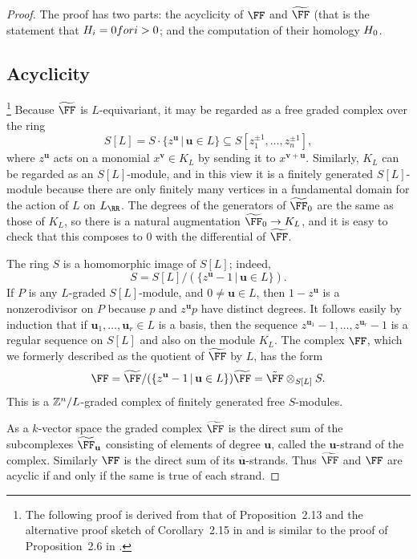 \documentclass{amsart}
\begin{document}
\begin{proof}
The proof has two parts: the acyclicity of $\FF$ and $\tF$ (that is the statement that $H_i = 0 for i>0$; and the computation of their homology $H_0$.

\subsection{Acyclicity}
\footnote{The following proof is derived from that of Proposition~2.13 and the alternative proof sketch of Corollary~2.15 in \cite{BCHS+25} and is similar to the proof of Proposition~2.6 in \cite{BH25}.}
Because $\tF$ is $L$-equivariant, it may be regarded as a free graded complex over the ring
\[
S[L]=S\cdot \{z^{\mathbf{u}} \,|\, \mathbf{u}\in L\}\subseteq S[z_1^{\pm1},\ldots,z_n^{\pm1}],
\]
where $z^{\mathbf{u}}$ acts on a monomial $x^{\mathbf{v}}\in K_L$ by sending it to $x^{\mathbf{v}+\mathbf{u}}$. Similarly, $K_L$ can be regarded as an $S[L]$-module, and in this view it is a finitely generated $S[L]$-module because there are only finitely many vertices in a
fundamental domain for the action of $L$ on $L_\RR$. The degrees of the generators of
$\tF_0$ are the same as those of $K_L$, so there is a natural augmentation $\tF_0\to K_L$, and it is easy to check that this composes to 0 with the differential of $\tF$.

The ring $S$ is a homomorphic image of $S[L]$; indeed,
$$
S = S[L]/(\{ z^{\mathbf{u}}-1 \,|\, \mathbf{u}\in L\}).
$$
If $P$ is any $L$-graded $S[L]$-module, and $0 \neq \mathbf{u}\in L$, then $1-z^{\mathbf{u}}$ is a nonzerodivisor on $P$ because $p$ and $z^{\mathbf{u}}p$ have distinct degrees. It follows easily by induction that if $\mathbf{u}_1,\ldots,\mathbf{u}_r\in L$ is a basis, then the sequence $z^{\mathbf{u}_1}-1,\ldots,z^{\mathbf{u}_r}-1$ is a regular sequence on $S[L]$ and also on the module $K_L$. The complex
 $\FF$, which we formerly described as the quotient of $\tF$ by $L$,  has the form
 $$
 \FF = \tF/(\{ z^{\mathbf{u}}-1 \,|\, \mathbf{u}\in L\})\tF =   \tilde \FF \otimes_{S[L]} S.
$$
This is a $\mathbb Z^n/L$-graded complex of finitely generated free $S$-modules.

As a $k$-vector space the graded complex $\tF$ is the direct sum of the subcomplexes $\tF_{\mathbf u}$ consisting of elements of degree $\mathbf u$, called the $\mathbf u$-strand of the complex. Similarly $\FF$ is the direct sum of its $\overline{\mathbf u}$-strands. Thus $\tF$ and $\FF$ are acyclic if and only if the same is true of each strand. 


\end{proof}
\end{document}
